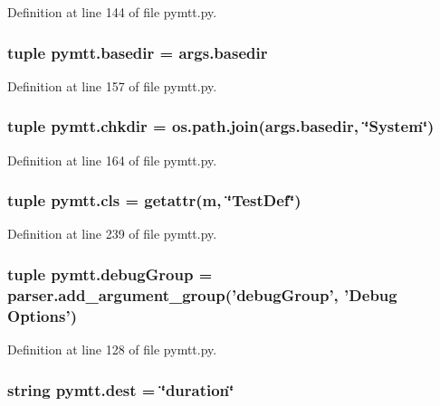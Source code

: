 Definition at line 144 of file pymtt.\-py.

\hypertarget{namespacepymtt_a968aa7c33a2106380483390a0fa2a045}{
\subsubsection[{basedir}]{\setlength{\rightskip}{0pt plus 5cm}tuple pymtt.\-basedir = args.\-basedir}}\label{namespacepymtt_a968aa7c33a2106380483390a0fa2a045}


Definition at line 157 of file pymtt.\-py.

\hypertarget{namespacepymtt_a574a50dd90d5a2f46fcb0e27b43a7af9}{
\subsubsection[{chkdir}]{\setlength{\rightskip}{0pt plus 5cm}tuple pymtt.\-chkdir = os.\-path.\-join(args.\-basedir, \char`\"{}System\char`\"{})}}\label{namespacepymtt_a574a50dd90d5a2f46fcb0e27b43a7af9}


Definition at line 164 of file pymtt.\-py.

\hypertarget{namespacepymtt_a17f658b5d141d51664bb3ede8830c4c0}{
\subsubsection[{cls}]{\setlength{\rightskip}{0pt plus 5cm}tuple pymtt.\-cls = getattr({\bf m}, \char`\"{}Test\-Def\char`\"{})}}\label{namespacepymtt_a17f658b5d141d51664bb3ede8830c4c0}


Definition at line 239 of file pymtt.\-py.

\hypertarget{namespacepymtt_af066a010075617c13a5595243ceb9041}{
\subsubsection[{debug\-Group}]{\setlength{\rightskip}{0pt plus 5cm}tuple pymtt.\-debug\-Group = parser.\-add\-\_\-argument\-\_\-group('debug\-Group', 'Debug Options')}}\label{namespacepymtt_af066a010075617c13a5595243ceb9041}


Definition at line 128 of file pymtt.\-py.

\hypertarget{namespacepymtt_a9ecea46ee6082edb9bbdd8393829e18e}{
\subsubsection[{dest}]{\setlength{\rightskip}{0pt plus 5cm}string pymtt.\-dest = \char`\"{}duration\char`\"{}}}\label{namespacepymtt_a9ecea46ee6082edb9bbdd8393829e18e}


